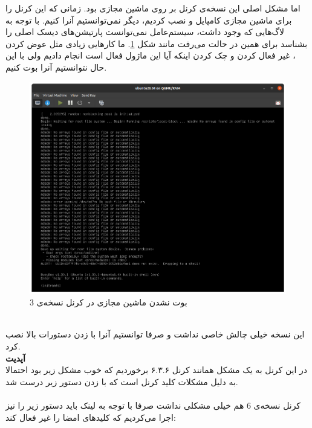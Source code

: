 اما مشکل اصلی این نسخه‌ی کرنل بر روی ماشین مجازی بود. زمانی که این کرنل را برای ماشین مجازی کامپایل
و نصب کردیم، دیگر نمی‌توانستیم آنرا
کنیم. با توجه به لاگ‌هایی که وجود داشت،‌ سیستم‌عامل نمی‌توانست پارتیشن‌های دیسک اصلی را بشناسد برای همین در
حالت
می‌رفت مانند شکل
\ref{fig:into:kernel:vm3}.
ما کار‌هایی زیادی مثل عوض کردن
،‌
غیر فعال کردن
 و
چک کردن اینکه آیا این ماژول فعال است انجام دادیم ولی با این حال نتوانستیم آنرا بوت کنیم.
\begin{figure}[H]
    \centering
    \includegraphics[scale=0.3]{pictures/intro/kvm-kernel-3.png}
    \caption{بوت نشدن ماشین مجازی در کرنل نسخه‌ی 3}
    \label{fig:into:kernel:vm3}
\end{figure}

\\\noindent
این نسخه خیلی چالش خاصی نداشت و صرفا توانستیم آنرا با زدن دستورات بالا نصب کرد.
\\
\textbf{آپدیت}
\\
در این کرنل به یک مشکل همانند کرنل ۶.۳.۶ برخوردیم که خوب مشکل زیر بود 
احتمالا به دلیل مشکلات کلید کرنل است که با زدن دستور زیر درست شد.
\\
\\\noindent
کرنل نسخه‌ی 6 هم خیلی مشکلی نداشت صرفا با توجه به
لینک باید دستور زیر را نیز اجرا می‌کردیم که کلید‌های امضا را غیر فعال کند:

